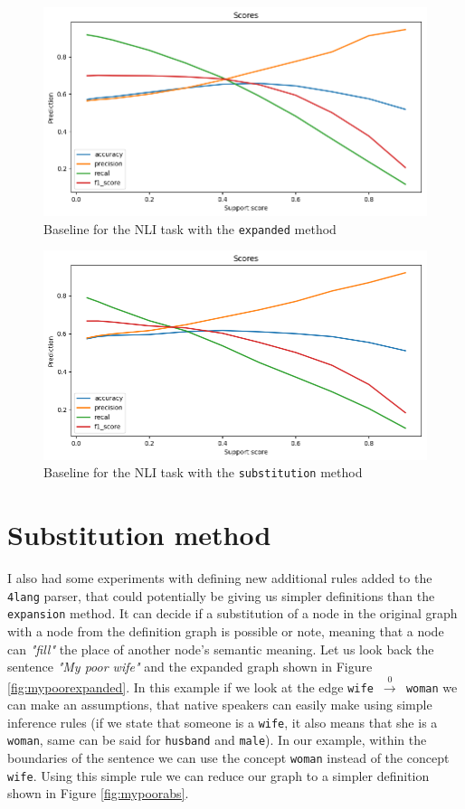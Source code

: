\begin{figure}
	\centering
	\includegraphics[scale=0.5]{figures/nliexpanded}
	\caption{Baseline for the NLI task with the \texttt{expanded} method}
	\label{fig:nliexpanded}
\end{figure}

\begin{figure}
	\centering
	\includegraphics[scale=0.5]{figures/nliabstract}
	\caption{Baseline for the NLI task with the \texttt{substitution} method}
	\label{fig:nliabstract}
\end{figure}

\section{Substitution method}
I also had some experiments with defining new additional rules added to the \texttt{4lang} parser, that could potentially be giving us simpler definitions than the \texttt{expansion} method. It can decide if a substitution of a node in the original graph with a node from the definition graph is possible or note, meaning that a node can \textit{"fill"} the place of another node's semantic meaning. Let us look back the sentence \textit{"My poor wife"} and the expanded graph shown in Figure \ref{fig:mypoorexpanded}. In this example if we look at the edge \texttt{wife $\xrightarrow0$ woman} we can make an assumptions, that native speakers can easily make using simple inference rules \cite{Kovacs:2018} (if we state that someone is a \texttt{wife}, it also means that she is a \texttt{woman}, same can be said for \texttt{husband} and \texttt{male}). In our example, within the boundaries of the sentence we can use the concept \texttt{woman} instead of the concept \texttt{wife}. Using this simple rule we can reduce our graph to a simpler definition shown in Figure \ref{fig:mypoorabs}.

